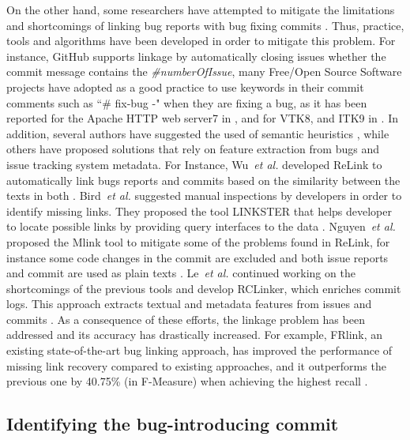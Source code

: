 \documentclass[a4paper, 12pt]{book}
\begin{document}
On the other hand, some researchers have attempted to mitigate the limitations and shortcomings of linking bug reports with bug fixing commits \cite{herzig2013s,rodriguez2016bugtracking,tan2015online}. Thus,  practice, tools and algorithms have been developed in order to mitigate this problem. For instance, GitHub supports linkage by automatically closing issues whether the commit message contains the \emph{\#numberOfIssue}, many Free/Open Source Software projects have adopted as a good practice to use keywords in their commit comments such as ``\# fix-bug -" when they are fixing a bug, as it has been reported for the Apache HTTP web server7 in \cite{bachmann2010missing}, and for VTK8, and ITK9 in \cite{mcintosh2016empirical}. In addition, several authors have suggested the used of semantic heuristics \cite{schroter2006if,vcubranic2003hipikat,zimmermann2007predicting} , while others have proposed solutions that rely on feature extraction from bugs and issue tracking system metadata. For Instance, Wu~\emph{et al.} developed ReLink to automatically link bugs reports and commits based on the similarity between the texts in both \cite{wu2011relink}. Bird~\emph{et al.} suggested manual inspections by developers in order to identify missing links. They proposed the tool LINKSTER that helps developer to locate possible links by providing query interfaces to the data \cite{bird2010linkster}. Nguyen~\emph{et al.} proposed the Mlink tool to mitigate some of the problems found in ReLink, for instance some code changes in the commit are excluded and both issue reports and commit are used as plain texts \cite{nguyen2012multi}. Le~\emph{et al.} continued working on the shortcomings of the previous tools and develop RCLinker, which enriches commit logs. This approach extracts textual and metadata features from issues and commits \cite{le2015rclinker}. As a consequence of these efforts, the linkage problem has been addressed and its accuracy has drastically increased. For example, FRlink, an existing state-of-the-art bug linking approach, has improved the performance of missing link recovery compared to existing approaches, and it outperforms the previous one by 40.75\% (in F-Measure) when achieving the highest recall \cite{sun2017frlink}.

\subsection{Identifying the bug-introducing commit}
\end{document}
